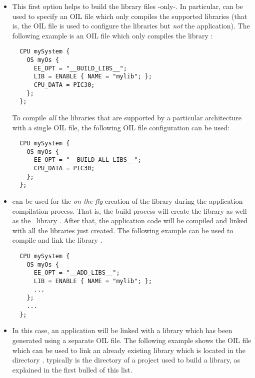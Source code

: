 \begin{itemize}

\item
  This first option helps to build the library files -only-. In
  particular,  can be used to specify an OIL file which
  only compiles the supported libraries (that is, the OIL file is used
  to configure the libraries but {\em not} the application). The
  following example is an OIL file which only compiles the library
  :

\begin{lstlisting}
  CPU mySystem {
    OS myOs {
      EE_OPT = "__BUILD_LIBS__";
      LIB = ENABLE { NAME = "mylib"; };
      CPU_DATA = PIC30;
    };
  };
\end{lstlisting}

\begin{note}
To compile {\em all} the libraries that are supported by a particular
architecture with a single OIL file, the following OIL file
configuration can be used:

\begin{lstlisting}
  CPU mySystem {
    OS myOs {
      EE_OPT = "__BUILD_ALL_LIBS__";
      CPU_DATA = PIC30;
    };
  };
\end{lstlisting}

\end{note}


\item
   can be used for the {\em on-the-fly} creation of the
  library during the application compilation process. That is, the
  build process will create the library as well as the \ee\ library
  . After that, the application code will be compiled
  and linked with all the libraries just created. The following
  example can be used to compile and link the library .

\begin{lstlisting}
  CPU mySystem {
    OS myOs {
      EE_OPT = "__ADD_LIBS__";
      LIB = ENABLE { NAME = "mylib"; };
      ...
    };
    ...
  };
\end{lstlisting}

\item
  In this case, an application will be linked with a library which has
  been generated using a separate OIL file. The following example
  shows the OIL file which can be used to link an already existing
  library which is located in the directory
  .  typically is the 
  directory of a project used to build a library, as explained in the
  first bulled of this list.


\end{itemize}
